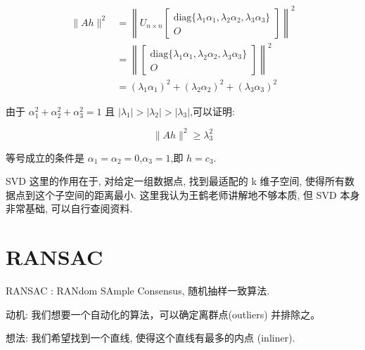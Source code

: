 $$
\begin{aligned}
\|Ah\|^2 &= \left\| U_{n \times n} \begin{bmatrix} \text{diag}\{\lambda_1 \alpha_1, \lambda_2 \alpha_2, \lambda_3 \alpha_3\} \\ O \end{bmatrix} \right\|^2 \\
&= \left\| \begin{bmatrix} \text{diag}\{\lambda_1 \alpha_1, \lambda_2 \alpha_2, \lambda_3 \alpha_3\} \\ O \end{bmatrix} \right\|^2 \\
&= (\lambda_1 \alpha_1)^2 + (\lambda_2 \alpha_2)^2 + (\lambda_3 \alpha_3)^2
\end{aligned}
$$

由于 $\alpha_1^2 + \alpha_2^2 + \alpha_3^2 = 1$ 且 $|\lambda_1| > |\lambda_2| > |\lambda_3|$,可以证明:

$$
\|Ah\|^2 \geq \lambda_3^2
$$

等号成立的条件是 $\alpha_1 = \alpha_2 = 0$,$\alpha_3 = 1$,即 $h = c_3$.

SVD 这里的作用在于, 对给定一组数据点, 找到最适配的 k 维子空间, 使得所有数据点到这个子空间的距离最小. 这里我认为王鹤老师讲解地不够本质, 但 SVD 本身非常基础, 可以自行查阅资料.

\section{RANSAC}

RANSAC : RANdom SAmple Consensus, 随机抽样一致算法.

动机: 我们想要一个自动化的算法，可以确定离群点(outliers) 并排除之。

想法: 我们希望找到一个直线, 使得这个直线有最多的内点 (inliner).

